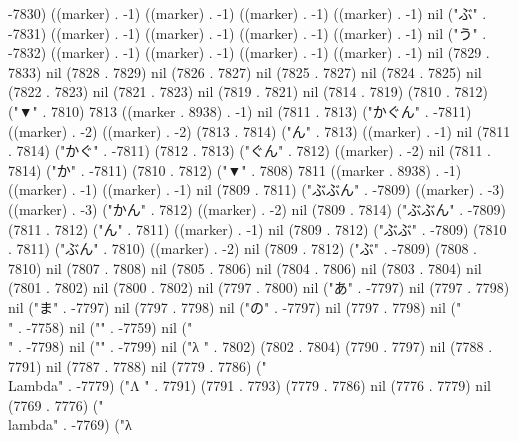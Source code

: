{-7830) ((marker) . -1) ((marker) . -1) ((marker) . -1) ((marker) . -1) nil ("ぶ" . -7831) ((marker) . -1) ((marker) . -1) ((marker) . -1) ((marker) . -1) nil ("う" . -7832) ((marker) . -1) ((marker) . -1) ((marker) . -1) ((marker) . -1) nil (7829 . 7833) nil (7828 . 7829) nil (7826 . 7827) nil (7825 . 7827) nil (7824 . 7825) nil (7822 . 7823) nil (7821 . 7823) nil (7819 . 7821) nil (7814 . 7819) (7810 . 7812) ("▼" . 7810) 7813 ((marker . 8938) . -1) nil (7811 . 7813) ("かぐん" . -7811) ((marker) . -2) ((marker) . -2) (7813 . 7814) ("ん" . 7813) ((marker) . -1) nil (7811 . 7814) ("かぐ" . -7811) (7812 . 7813) ("ぐん" . 7812) ((marker) . -2) nil (7811 . 7814) ("か" . -7811) (7810 . 7812) ("▼" . 7808) 7811 ((marker . 8938) . -1) ((marker) . -1) ((marker) . -1) nil (7809 . 7811) ("ぶぶん" . -7809) ((marker) . -3) ((marker) . -3) ("かん" . 7812) ((marker) . -2) nil (7809 . 7814) ("ぶぶん" . -7809) (7811 . 7812) ("ん" . 7811) ((marker) . -1) nil (7809 . 7812) ("ぶぶ" . -7809) (7810 . 7811) ("ぶん" . 7810) ((marker) . -2) nil (7809 . 7812) ("ぶ" . -7809) (7808 . 7810) nil (7807 . 7808) nil (7805 . 7806) nil (7804 . 7806) nil (7803 . 7804) nil (7801 . 7802) nil (7800 . 7802) nil (7797 . 7800) nil ("あ" . -7797) nil (7797 . 7798) nil ("ま" . -7797) nil (7797 . 7798) nil ("の" . -7797) nil (7797 . 7798) nil ("\\" . -7758) nil ("{" . -7759) nil ("\\" . -7798) nil ("}" . -7799) nil ("λ
" . 7802) (7802 . 7804) (7790 . 7797) nil (7788 . 7791) nil (7787 . 7788) nil (7779 . 7786) ("\\Lambda" . -7779) ("Λ
" . 7791) (7791 . 7793) (7779 . 7786) nil (7776 . 7779) nil (7769 . 7776) ("\\lambda" . -7769) ("λ
}

